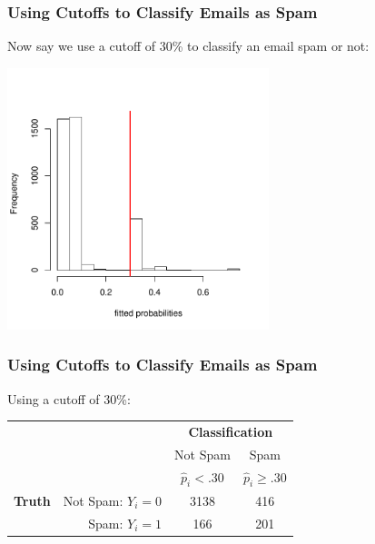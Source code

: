 \documentclass[slides]{beamer}
\newcommand{\blue}[1]{\textcolor{blue2}{#1}}
\begin{document}
\begin{frame}[fragile]
\frametitle{Using Cutoffs to Classify Emails as Spam}

Now say we use a cutoff of 30\% to \blue{classify} an email spam or not:
\begin{center}
\includegraphics[width=3in]{figure/fitted3.pdf}
\end{center}

\end{frame}


\begin{frame}[fragile]
\frametitle{Using Cutoffs to Classify Emails as Spam}

Using a cutoff of 30\%:
\begin{center}
  \begin{tabular}{cr|cc}
     \multicolumn{2}{c}{}  & \multicolumn{2}{c}{\textbf{Classification}} \\ 
     &  & Not Spam & Spam \\ 
     &  & $\widehat{p}_i < .30$ & $\widehat{p}_i \geq .30$ \\      
\hline
    \textbf{Truth} & Not Spam: $Y_i=0$ & 3138 & 416\\
     & Spam: $Y_i=1$ & 166 & 201\\ 
    \hline
  \end{tabular}
\end{center}
%
%

\end{frame}
\end{document}
